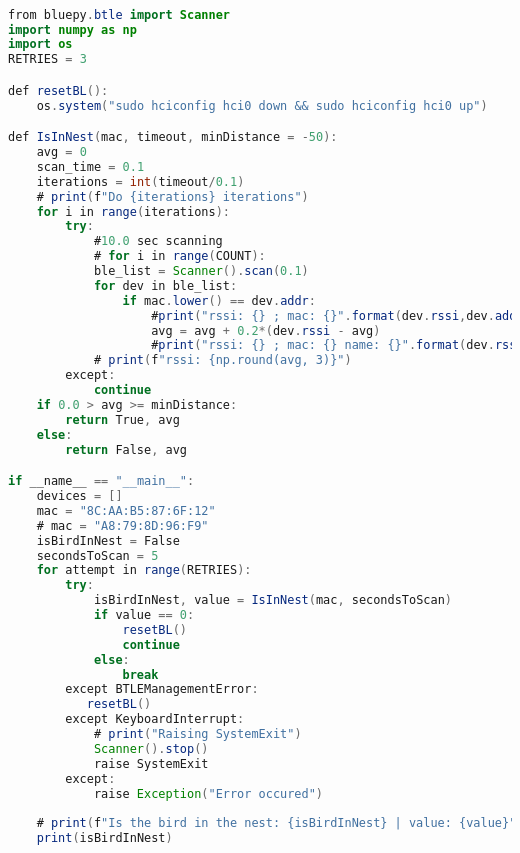 \begin{lstlisting}[language=Java]

from bluepy.btle import Scanner
import numpy as np
import os
RETRIES = 3

def resetBL():
    os.system("sudo hciconfig hci0 down && sudo hciconfig hci0 up")

def IsInNest(mac, timeout, minDistance = -50):
    avg = 0
    scan_time = 0.1
    iterations = int(timeout/0.1)
    # print(f"Do {iterations} iterations")
    for i in range(iterations):
        try:
            #10.0 sec scanning
            # for i in range(COUNT):
            ble_list = Scanner().scan(0.1)
            for dev in ble_list:
                if mac.lower() == dev.addr:
                    #print("rssi: {} ; mac: {}".format(dev.rssi,dev.addr))
                    avg = avg + 0.2*(dev.rssi - avg) 
                    #print("rssi: {} ; mac: {} name: {}".format(dev.rssi,dev.addr, dev['scanData'][8]))
            # print(f"rssi: {np.round(avg, 3)}")
        except:
            continue
    if 0.0 > avg >= minDistance:
        return True, avg
    else:
        return False, avg

if __name__ == "__main__":
    devices = []
    mac = "8C:AA:B5:87:6F:12"
    # mac = "A8:79:8D:96:F9"
    isBirdInNest = False
    secondsToScan = 5
    for attempt in range(RETRIES):
        try:
            isBirdInNest, value = IsInNest(mac, secondsToScan)
            if value == 0:
                resetBL()
                continue
            else:
                break
        except BTLEManagementError:
           resetBL()
        except KeyboardInterrupt:
            # print("Raising SystemExit")
            Scanner().stop()
            raise SystemExit
        except:
            raise Exception("Error occured")
    
    # print(f"Is the bird in the nest: {isBirdInNest} | value: {value}")
    print(isBirdInNest)

\end{lstlisting}


